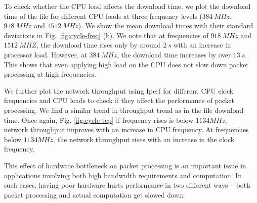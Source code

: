 To check whether the CPU load affects the download time, we plot the download time of the file for different CPU loads at three frequency levels ($384 \ MHz$, $918 \ MHz$ and $1512 \ MHz$). We show the mean download times with their standard deviations in Fig. \ref{fig:cycle-freq} (b). We note that at frequencies of $918 \ MHz$ and $1512 \ MHZ$, the download time rises only by around $2 \ s$ with an increase in processor load. However, at $384 \ MHz$, the download time increases by over $13 \ s$. This shows that even applying high load on the CPU does not slow down packet processing at high frequencies.

We further plot the network throughput using Iperf for different CPU clock frequencies and CPU loads to check if they affect the performance of packet processing.
We find a similar trend in throughput trend as in the file download time.
Once again, Fig. \ref{fig:cycle-tcp} if frequency rises is below $1134 MHz$, network throughput improves with an increase in CPU frequency.
At frequencies below $1134 MHz$, the network throughput rises with an increase in the clock frequency.

This effect of hardware bottleneck on packet processing is an important issue in applications involving both high bandwidth requirements and computation.
In such cases, having poor hardware hurts performance in two different ways -- both packet processing and actual computation get slowed down.

